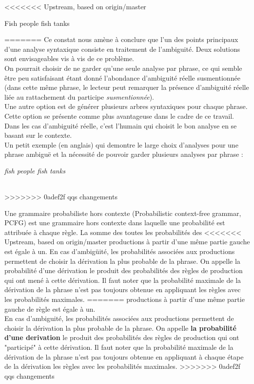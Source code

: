 \documentclass[12pt]{article}
\begin{document}
<<<<<<< Upstream, based on origin/master
\begin{exe}
\ex Fish people fish tanks
\end{exe}
=======
Ce constat nous am\`ene \`a conclure que l'un des points principaux d'une
analyse syntaxique consiste en traitement de l'ambiguit\'e. Deux solutions sont
envisageables vis \`a vis de ce probl\`eme. 
\\

On pourrait choisir de ne garder
qu'une seule analyse par phrase, ce qui semble \^etre peu satisfaisant \'etant
donn\'e l'abondance d'ambiguit\'e r\'eelle susmentionn\'ee (dans cette m\^eme phrase, le
lecteur peut remarquer la pr\'esence d'ambiguit\'e r\'eelle li\'ee au rattachement du
participe \emph{susmentionn\'ee}). \\

Une autre option est de g\'en\'erer plusieurs arbres syntaxiques pour chaque phrase.
Cette option se pr\'esente comme plus avantageuse dans le cadre de ce travail.
Dans les cas d'ambiguit\'e r\'eelle, c'est l'humain qui choisit le bon analyse en
se basant sur le contexte. \\

Un petit exemple (en anglais) qui demontre le large
choix d'analyses pour une phrase ambiguë et la n\'ecessit\'e de pouvoir garder plusieurs analyses par phrase :
\\
\centerline{\textit{fish people fish tanks}}\\
>>>>>>> 0adef2f qqs changements

Une grammaire probabiliste hors contexte (Probabilistic context-free grammar,
PCFG) est une grammaire hors contexte dans laquelle une probabilit\'e est
attribu\'ee \`a chaque r\`egle. La somme des toutes les probabilit\'es des
<<<<<<< Upstream, based on origin/master
productions \`a partir d'une m\^eme partie gauche est \'egale \`a un. 
En cas d'ambig\"uit\'e, les probabilit\'es associ\'ees aux productions permettent
de choisir la d\'erivation la plus probable de la phrase. On appelle la
probabilit\'e d'une d\'erivation le produit des probabilit\'es des r\`egles de
production qui ont men\'e \`a cette d\'erivation. Il faut noter que la
probabilit\'e maximale de la d\'erivation de la phrase n'est pas toujours obtenue
en appliquant les r\`egles avec les probabilit\'es maximales.
=======
productions \`a partir d'une m\^eme partie gauche de r\`egle est \'egale \`a un. \\

En cas d'ambiguit\'e, les probabilit\'es associ\'ees aux productions permettent
de choisir la d\'erivation la plus probable de la phrase. On appelle \textbf{la
probabilit\'e d'une derivation} le produit des probabilit\'es des r\`egles de
production qui ont "particip\'e" \`a cette d\'erivation. Il faut noter que la
probabilit\'e maximale de la d\'erivation de la phrase n'est pas toujours obtenue
en appliquant \`a chaque \'etape de la d\'erivation les r\`egles avec les probabilit\'es
maximales.
>>>>>>> 0adef2f qqs changements
\end{document}
